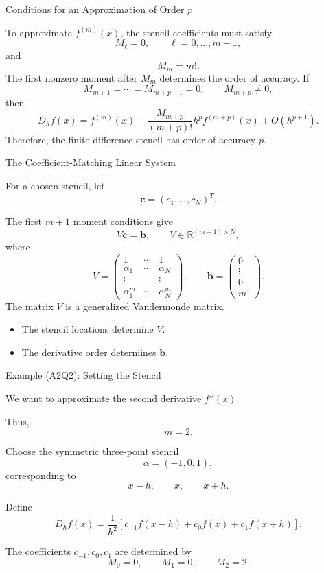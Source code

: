 \documentclass{beamer}
\begin{document}
\begin{frame}{Conditions for an Approximation of Order \(p\)}

To approximate \(f^{(m)}(x)\), the stencil coefficients must satisfy
\[
M_\ell=0,
\qquad \ell=0,\ldots,m-1,
\]
and
\[
M_m=m!.
\]
The first nonzero moment after \(M_m\) determines the order of accuracy.
If
\[
M_{m+1}=\cdots=M_{m+p-1}=0,
\qquad
M_{m+p}\neq 0,
\]
then
\[
D_hf(x)
=
f^{(m)}(x)
+
\frac{M_{m+p}}{(m+p)!}
h^p f^{(m+p)}(x)
+
O(h^{p+1}).
\]
Therefore, the finite-difference stencil has order of accuracy \(p\).

\end{frame}

\begin{frame}{The Coefficient-Matching Linear System}

For a chosen stencil, let
\[
\boldsymbol{c}
=
(c_1,\ldots,c_N)^T.
\]

The first \(m+1\) moment conditions give
\[
V\boldsymbol{c}
=
\boldsymbol{b},
\qquad
V\in\mathbb{R}^{(m+1)\times N},
\]
where
\[
V=
\begin{pmatrix}
1&\cdots&1\\
\alpha_1&\cdots&\alpha_N\\
\vdots&&\vdots\\
\alpha_1^m&\cdots&\alpha_N^m
\end{pmatrix},
\qquad
\boldsymbol{b}
=
\begin{pmatrix}
0\\
\vdots\\
0\\
m!
\end{pmatrix}.
\]
The matrix \(V\) is a generalized Vandermonde matrix.
\begin{itemize}
    \item The stencil locations determine \(V\).
    \item The derivative order determines \(\boldsymbol{b}\).
\end{itemize}
\end{frame}


\begin{frame}{Example (A2Q2): Setting the Stencil}

We want to approximate the second derivative \(f''(x)\).

Thus,
\[
m=2.
\]

Choose the symmetric three-point stencil
\[
\alpha=(-1,0,1),
\]
corresponding to
\[
x-h,\qquad x,\qquad x+h.
\]

Define
\[
D_hf(x)
=
\frac{1}{h^2}
\left[
c_{-1}f(x-h)
+c_0f(x)
+c_1f(x+h)
\right].
\]

The coefficients \(c_{-1},c_0,c_1\) are determined by
\[
M_0=0,\qquad M_1=0,\qquad M_2=2.
\]

\end{frame}
\end{document}
